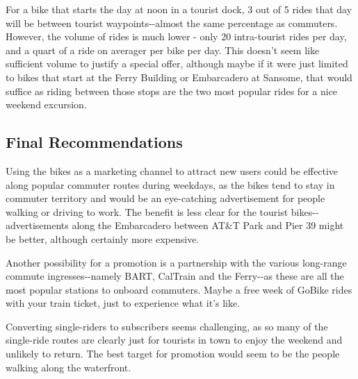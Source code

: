 \documentclass[11pt]{article}
\begin{document}
For a bike that starts the day at noon in a tourist dock, 3 out of 5
rides that day will be between tourist waypoints-\/-almost the same
percentage as commuters. However, the volume of rides is much lower -
only 20 intra-tourist rides per day, and a quart of a ride on averager
per bike per day. This doesn't seem like sufficient volume to justify a
special offer, although maybe if it were just limited to bikes that
start at the Ferry Building or Embarcadero at Sansome, that would
suffice as riding between those stops are the two most popular rides for
a nice weekend excursion.

\subsection{Final Recommendations}\label{final-recommendations}

Using the bikes as a marketing channel to attract new users could be
effective along popular commuter routes during weekdays, as the bikes
tend to stay in commuter territory and would be an eye-catching
advertisement for people walking or driving to work. The benefit is less
clear for the tourist bikes-\/-advertisements along the Embarcadero
between AT\&T Park and Pier 39 might be better, although certainly more
expensive.

Another possibility for a promotion is a partnership with the various
long-range commute ingresses-\/-namely BART, CalTrain and the
Ferry-\/-as these are all the most popular stations to onboard
commuters. Maybe a free week of GoBike rides with your train ticket,
just to experience what it's like.

Converting single-riders to subscribers seems challenging, as so many of
the single-ride routes are clearly just for tourists in town to enjoy
the weekend and unlikely to return. The best target for promotion would
seem to be the people walking along the waterfront.


    
    
    
    
\end{document}
